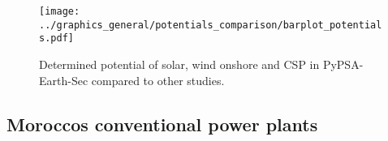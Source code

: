 \begin{figure}[h!]
    \centering
    \texttt{[image: ../graphics\_general/potentials\_comparison/barplot\_potentials.pdf]}
    \caption{Determined potential of solar, wind onshore and CSP in PyPSA-Earth-Sec compared to other studies.}
    \label{fig:potentials}
\end{figure}


\subsection{Moroccos conventional power plants}

\clearpage
\onecolumn
\begin{footnotesize}
    
\end{footnotesize}
\clearpage
\twocolumn